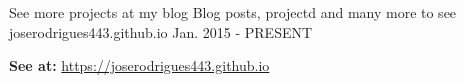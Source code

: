 \begin{cventries}

  \cventry
    {See more projects at my blog} %
    {Blog posts, projectd and many more to see} %
    {joserodrigues443.github.io} %
    {Jan. 2015 - PRESENT} %
    {
      \begin{cvitems} %
        \item {\textbf{See at:} \url{https://joserodrigues443.github.io}}
      \end{cvitems}
    }




\end{cventries}

